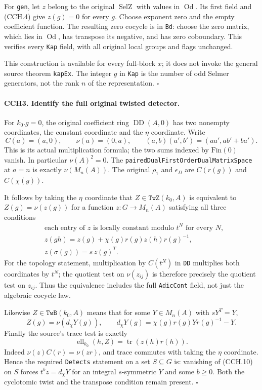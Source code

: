 For \texttt{gen}, let $z$ belong to the original
$\operatorname{SelZ}$ with values in $\operatorname{Od}$.
Its first field and (CCH.4) give $z(g)=0$ for every $g$.
Choose exponent zero and the empty coefficient function.  The
resulting zero cocycle is in \texttt{Bd}: choose the zero matrix,
which lies in $\operatorname{Od}$, has transpose its negative,
and has zero coboundary.  This verifies every \texttt{Kap} field,
with all original local groups and flags unchanged.

This construction is available for every full-block $x$; it
does not invoke the general source theorem \texttt{kapEx}.
The integer $g$ in \texttt{Kap} is the number of odd Selmer
generators, not the rank $n$ of the representation.
\hfill$\square$

\paragraph{CCH3. Identify the full original twisted detector.}
\label{claim:CCH3}
For $k_0.g=0$, the original coefficient ring
$\operatorname{DD}(A,0)$ has two nonempty coordinates,
the constant coordinate and the $\eta$ coordinate.  Write
\[
 C(a)=(a,0),\qquad \nu(a)=(0,a),\qquad
 (a,b)(a',b')=(aa',ab'+ba').                            \tag{CCH.7}
\]
This is its actual multiplication formula; the two sums indexed
by $\mathrm{Fin}(0)$ vanish.  In particular $\nu(A)^2=0$.
The \texttt{pairedDualFirstOrderDualMatrixSpace} at $a=n$
is exactly $\nu(M_n(A))$.  The original $\rho_1$ and
$\epsilon_D$ are $C(r(g))$ and $C(\chi(g))$.

It follows by taking the $\eta$ coordinate that
$Z\in\texttt{TwZ}(k_0,A)$ is equivalent to $Z(g)=\nu(z(g))$
for a function $z:G\to M_n(A)$ satisfying all three conditions
\[
 \begin{split}
 &\text{each entry of $z$ is locally constant modulo $t^N$ for every $N$},\\
 &z(gh)=z(g)+\chi(g)r(g)z(h)r(g)^{-1},\\
 &z(\sigma(g))=s\,z(g)^T.
 \end{split}
 \tag{CCH.8}
\]
For the topology statement, multiplication by $C(t^N)$ in
\texttt{DD} multiplies both coordinates by $t^N$; the quotient
test on $\nu(z_{ij})$ is therefore precisely the quotient test
on $z_{ij}$.  Thus the equivalence includes the full
\texttt{AdicCont} field, not just the algebraic cocycle law.

Likewise $Z\in\texttt{TwB}(k_0,A)$ means that for some
$Y\in M_n(A)$ with $sY^T=Y$,
\[
 Z(g)=\nu(d_\chi Y(g)),\qquad
 d_\chi Y(g)=\chi(g)r(g)Yr(g)^{-1}-Y.                 \tag{CCH.9}
\]
Finally the source's trace test is exactly
\[
            \operatorname{ell}_{k_0}(h,Z)
                    =\operatorname{tr}(z(h)r(h)).      \tag{CCH.10}
\]
Indeed $\nu(z)C(r)=\nu(zr)$, and trace commutes with taking
the $\eta$ coordinate.  Hence the required \texttt{Detects}
statement on a set $S\subseteq G$ is: vanishing of (CCH.10)
on $S$ forces $t^b z=d_\chi Y$ for an integral $s$-symmetric
$Y$ and some $b\ge0$.  Both the cyclotomic twist and the
transpose condition remain present.
\hfill$\square$

